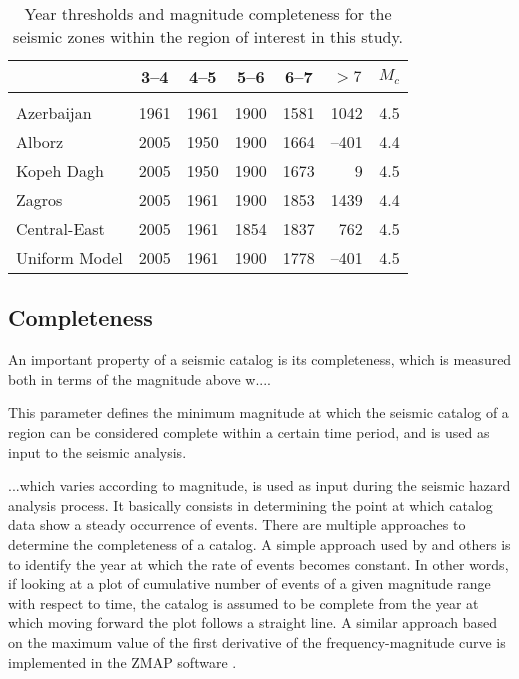 
\begin{table*}[t]
    \centering
    \caption{Year thresholds and magnitude completeness for the seismic zones within the region of interest in this study.}
    \begin{tabular}{lccccrc}
    	\cline{2-7}                                              \\[-1.6ex]
                        & 3--4 & 4--5 & 5--6 & 6--7 & 
                                  \multicolumn{1}{c}{$>7$} &$M_c$\\[0.6ex]
        \hline                                                   \\[-1.6ex]
        Azerbaijan      & 1961 & 1961 & 1900 & 1581 & 1042 & 4.5 \\
        Alborz          & 2005 & 1950 & 1900 & 1664 &--401 & 4.4 \\
        Kopeh Dagh      & 2005 & 1950 & 1900 & 1673 &    9 & 4.5 \\
        Zagros          & 2005 & 1961 & 1900 & 1853 & 1439 & 4.4 \\
        Central-East    & 2005 & 1961 & 1854 & 1837 &  762 & 4.5 \\
        Uniform Model   & 2005 & 1961 & 1900 & 1778 &--401 & 4.5 \\[0.5ex]
        \hline 
    \end{tabular}
    \label{tab:params} 
\end{table*}

\subsection{Completeness}

An important property of a seismic catalog is its completeness, which is measured both in terms of the magnitude above w....

This parameter defines the minimum magnitude at which the seismic catalog of a region can be considered complete within a certain time period, and is used as input to the seismic analysis. 

...which varies according to magnitude, is used as input during the seismic hazard analysis process. It basically consists in determining the point at which catalog data show a steady occurrence of events. There are multiple approaches to determine the completeness of a catalog. A simple approach used by \citet{Frankel1995} and others is to identify the year at which the rate of events becomes constant. In other words, if looking at a plot of cumulative number of events of a given magnitude range with respect to time, the catalog is assumed to be complete from the year at which moving forward the plot follows a straight line. A similar approach based on the maximum value of the first derivative of the frequency-magnitude curve is implemented in the ZMAP software \citep{Wiemer2001}.


